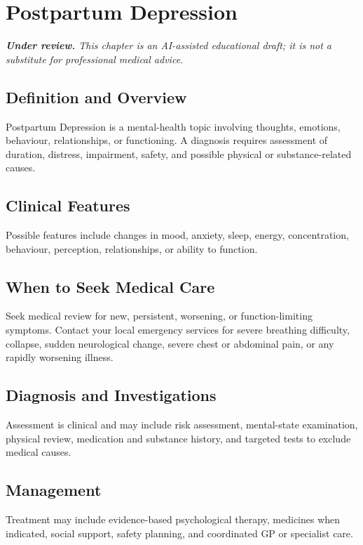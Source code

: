 \chapter{Postpartum Depression}

\medskip
\noindent\textit{\textbf{Under review.} This chapter is an AI-assisted educational draft; it is not a substitute for professional medical advice.}

\section*{Definition and Overview}
Postpartum Depression is a mental-health topic involving thoughts, emotions, behaviour, relationships, or functioning. A diagnosis requires assessment of duration, distress, impairment, safety, and possible physical or substance-related causes.

\section*{Clinical Features}
Possible features include changes in mood, anxiety, sleep, energy, concentration, behaviour, perception, relationships, or ability to function.

\section*{When to Seek Medical Care}
Seek medical review for new, persistent, worsening, or function-limiting symptoms. Contact your local emergency services for severe breathing difficulty, collapse, sudden neurological change, severe chest or abdominal pain, or any rapidly worsening illness.

\section*{Diagnosis and Investigations}
Assessment is clinical and may include risk assessment, mental-state examination, physical review, medication and substance history, and targeted tests to exclude medical causes.

\section*{Management}
Treatment may include evidence-based psychological therapy, medicines when indicated, social support, safety planning, and coordinated GP or specialist care.

